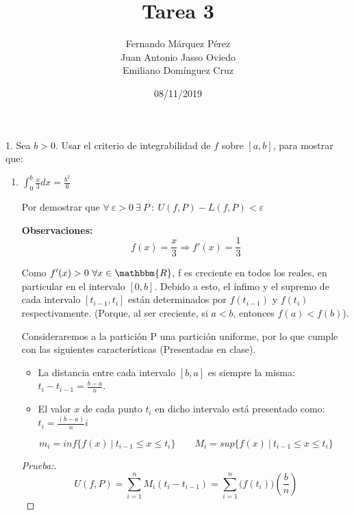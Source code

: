 \documentclass[12pt]{article}
\title{Tarea 3}
\author{Fernando Márquez Pérez \\ Juan Antonio Jasso Oviedo \\ Emiliano Dom\'inguez Cruz}
\date{08/11/2019}
\affil{Facultad de Ciencias\\UNAM}
\begin{document}
\begin{titlepage}
    \maketitle
\end{titlepage}

1. Sea $b>0$. Usar el criterio de integrabilidad de $f$ sobre $[a,b]$, para mostrar que:

\begin{enumerate}[\hspace{9px} a)]
    \item \(\displaystyle\int_{0}^{b}\frac{x}{3}dx=\frac{b^2}{6}\)\medskip

        Por demostrar que \(\forall \ \varepsilon>0 \ \exists \ P \ : \ U(f,P)-L(f,P)<\varepsilon\)\medskip

        \textbf{Observaciones:}
        \[f(x)=\frac{x}{3} \Rightarrow f'(x)=\frac{1}{3}\]

        Como \(f'(x)>0 \ \forall x \in \mathbbm{R}\), f es creciente en todos los reales, en particular en el intervalo $[0,b]$. Debido a esto, el \'infimo y el supremo de cada intervalo \([t_{i-1},t_i]\) est\'an determinados por \(f(t_{i-1})\) y \(f(t_i)\) respectivamente. (Porque, al ser creciente, si $a<b$, entonces \(f(a)<f(b)\)).\medskip

        Consideraremos a la partici\'on P una partici\'on uniforme, por lo que cumple con las siguientes caracter\'isticas (Presentadas en clase).
        \begin{itemize}
            \item La distancia entre cada intervalo $[b,a]$ es siempre la misma: \(t_i-t_{i-1}=\displaystyle\frac{b-a}{n}\).
            \item El valor $x$ de cada punto $t_i$ en dicho intervalo est\'a presentado como: \(t_i=\displaystyle\frac{(b-a)}{n}i\)
        \end{itemize}

        \[m_i=inf\{f(x) \ | \ t_{i-1} \leq x \leq t_i\} \qquad M_i=sup\{f(x) \ | \ t_{i-1} \leq x \leq t_i\}\]

        \begin{proof}[Prueba:]
            \begin{equation*}%
                U(f,P)=\sum_{i=1}^n M_i(t_i-t_{i-1}) = \sum_{i=1}^n \big(f(t_i)\big)\left(\displaystyle\frac{b}{n}\right)
            \end{equation*}


\end{proof}
\end{enumerate}
\end{document}
